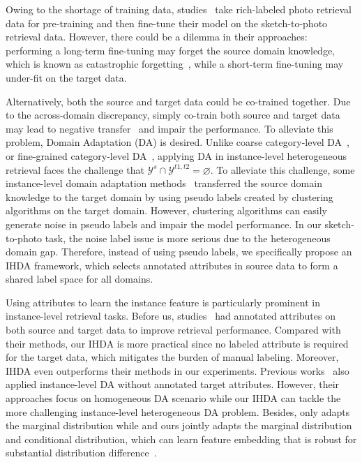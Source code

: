 \documentclass[journal]{IEEEtran}
\begin{document}
Owing to the shortage of training data, studies~\cite{song2017deep,wu2018light,wu2018coupled,deng2019residual,yu2016sketch,song2016deep} take rich-labeled photo retrieval data for pre-training and then fine-tune their model on the sketch-to-photo retrieval data. However, there could be a dilemma in their approaches: performing a long-term fine-tuning may forget the source domain knowledge, which is known as catastrophic forgetting~\cite{lopez2017gradient,aljundi2018memory}, while a short-term fine-tuning may under-fit on the target data.

Alternatively, both the source and target data could be co-trained together. Due to the across-domain discrepancy, simply co-train both source and target data may lead to negative transfer~\cite{pan2010survey} and impair the performance. To alleviate this problem, Domain Adaptation (DA) is desired. Unlike coarse category-level DA~\cite{pei2018multi,rozantsev2018beyond,cao2018partial,zou2019consensus}, or fine-grained category-level DA~\cite{gebru2017fine,cui2018large}, applying DA in instance-level heterogeneous retrieval faces the challenge that $\mathcal{Y}^{s} \cap \mathcal{Y}^{t1,t2} = \varnothing$. To alleviate this challenge, some instance-level domain adaptation methods~\cite{ge2020mutual,song2020unsupervised} transferred the source domain knowledge to the target domain by using pseudo labels created by clustering algorithms on the target domain. However, clustering algorithms can easily generate noise in pseudo labels and impair the model performance. In our sketch-to-photo task, the noise label issue is more serious due to the heterogeneous domain gap. Therefore, instead of using pseudo labels, we specifically propose an IHDA framework, which selects annotated attributes in source data to form a shared label space for all domains.


Using attributes to learn the instance feature is particularly prominent in instance-level retrieval tasks. Before us, studies~\cite{yu2016sketch,song2016deep,ouyang2016forgetmenot,liu2018deep} had annotated attributes on both source and target data to improve retrieval performance. Compared with their methods, our IHDA is more practical since no labeled attribute is required for the target data, which mitigates the burden of manual labeling. Moreover, IHDA even outperforms their methods in our experiments. Previous works~\cite{Lin2018multi,wang2018transferable} also applied instance-level DA without annotated target attributes. However, their approaches focus on homogeneous DA scenario while our IHDA can tackle the more challenging instance-level heterogeneous DA problem. Besides, \cite{wang2018transferable} only adapts the marginal distribution while \cite{Lin2018multi} and ours jointly adapts the marginal distribution and conditional distribution, which can learn feature embedding that is robust for substantial distribution difference~\cite{long2013transfer,saito2019semi}.
\end{document}
